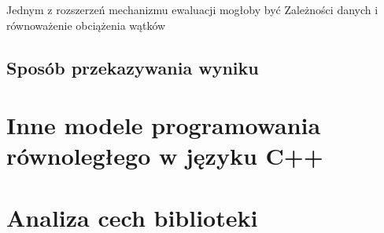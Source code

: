   Jednym z rozszerzeń mechanizmu ewaluacji mogłoby być
  Zależności danych i równoważenie obciążenia wątków
  
  

\subsection{Sposób przekazywania wyniku}

\section{Inne modele programowania równoległego w języku C++}

\section{Analiza cech biblioteki}